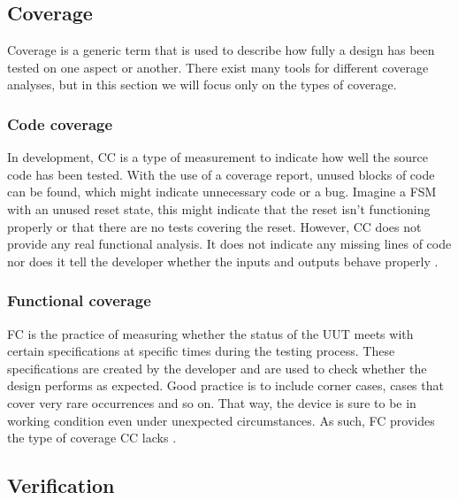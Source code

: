 \documentclass[11pt,british]{article}
\begin{document}
\subsection{Coverage}
Coverage is a generic term that is used to describe how fully a design has been tested on one aspect or another. There exist many tools for different coverage analyses, but in this section we will focus only on the types of coverage.

\subsubsection{Code coverage}
In development, \gls{CC} is a type of measurement to indicate how well the source code has been tested. With the use of a coverage report, unused blocks of code can be found, which might indicate unnecessary code or a bug. Imagine a \gls{FSM} with an unused reset state, this might indicate that the reset isn't functioning properly or that there are no tests covering the reset. However, CC does not provide any real functional analysis. It does not indicate any missing lines of code nor does it tell the developer whether the inputs and outputs behave properly \cite{coverage1,coverage2}.

\subsubsection{Functional coverage}
\gls{FC} is the practice of measuring whether the status of the \gls{UUT} meets with certain specifications at specific times during the testing process. These specifications are created by the developer and are used to check whether the design performs as expected. Good practice is to include corner cases, cases that cover very rare occurrences and so on. That way, the device is sure to be in working condition even under unexpected circumstances. As such, FC provides the type of coverage CC lacks \cite{functional1,functional2}.

\subsection{Verification}
\end{document}
